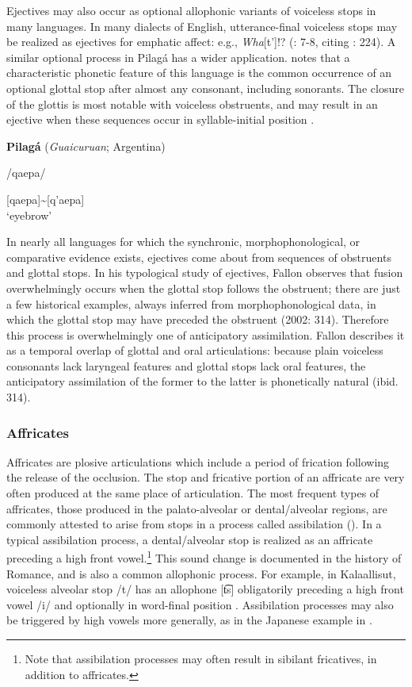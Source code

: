   Ejectives may also occur as optional allophonic variants of voiceless stops in many languages. In many dialects of English, utterance-final voiceless stops may be realized as ejectives for emphatic affect: e.g., \textit{Wha}[t’]!? (\citealt{Fallon2002}: 7-8, citing \citealt{Taylor1995}: 224). A similar optional process in Pilagá has a wider application. \citet{Vidal2001} notes that a characteristic phonetic feature of this language is the common occurrence of an optional glottal stop after almost any consonant, including sonorants. The closure of the glottis is most notable with voiceless obstruents, and may result in an ejective when these sequences occur in syllable-initial position .

\ea\label{ex:4.44}
  \textbf{Pilagá} (\textit{Guaicuruan}; Argentina)

/qaepa/

[qaepa]{\textasciitilde}[q’aepa]\\
\glt ‘eyebrow’
\citep[36]{Vidal2001}
\z

  In nearly all languages for which the synchronic, morphophonological, or comparative evidence exists, ejectives come about from sequences of obstruents and glottal stops. In his typological study of ejectives, Fallon observes that fusion overwhelmingly occurs when the glottal stop follows the obstruent; there are just a few historical examples, always inferred from morphophonological data, in which the glottal stop may have preceded the obstruent (2002: 314). Therefore this process is overwhelmingly one of anticipatory assimilation. Fallon describes it as a temporal overlap of glottal and oral articulations: because plain voiceless consonants lack laryngeal features and glottal stops lack oral features, the anticipatory assimilation of the former to the latter is phonetically natural (ibid. 314).

\subsubsection{{Affricates}}\label{sec:4.5.2.4}

  Affricates are plosive articulations which include a period of frication following the release of the occlusion. The stop and fricative portion of an affricate are very often produced at the same place of articulation. The most frequent types of affricates, those produced in the palato-alveolar or dental/alveolar regions, are commonly attested to arise from stops in a process called assibilation (\citealt{HallHamann2006,Telfer2006}). In a typical assibilation process, a dental/alveolar stop is realized as an affricate preceding a high front vowel.\footnote{{Note that assibilation processes may often result in sibilant fricatives, in addition to affricates.}} This sound change is documented in the history of Romance, and is also a common allophonic process. For example, in Kalaallisut, voiceless alveolar stop /t/ has an allophone [t͡s] obligatorily preceding a high front vowel /i/ and optionally in word-final position \citep[333]{Fortescue1984}. Assibilation processes may also be triggered by high vowels more generally, as in the Japanese example in .

